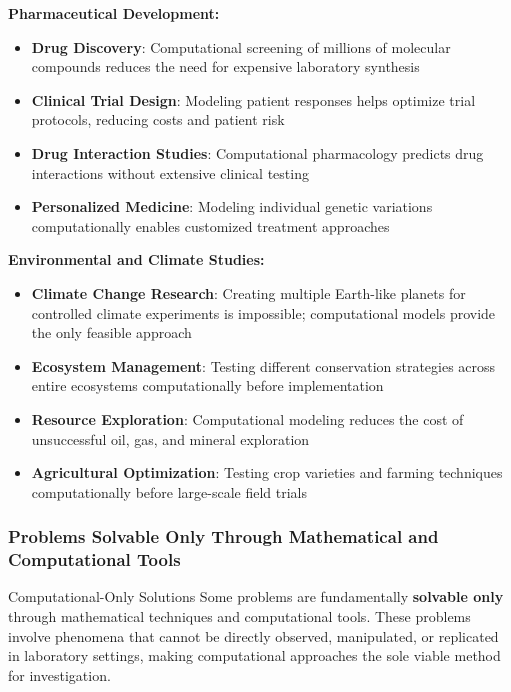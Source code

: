 \textbf{Pharmaceutical Development:}
\begin{itemize}
    \item \textbf{Drug Discovery}: Computational screening of millions of molecular compounds reduces the need for expensive laboratory synthesis
    \item \textbf{Clinical Trial Design}: Modeling patient responses helps optimize trial protocols, reducing costs and patient risk
    \item \textbf{Drug Interaction Studies}: Computational pharmacology predicts drug interactions without extensive clinical testing
    \item \textbf{Personalized Medicine}: Modeling individual genetic variations computationally enables customized treatment approaches
\end{itemize}

\textbf{Environmental and Climate Studies:}
\begin{itemize}
    \item \textbf{Climate Change Research}: Creating multiple Earth-like planets for controlled climate experiments is impossible; computational models provide the only feasible approach
    \item \textbf{Ecosystem Management}: Testing different conservation strategies across entire ecosystems computationally before implementation
    \item \textbf{Resource Exploration}: Computational modeling reduces the cost of unsuccessful oil, gas, and mineral exploration
    \item \textbf{Agricultural Optimization}: Testing crop varieties and farming techniques computationally before large-scale field trials
\end{itemize}

\subsubsection{Problems Solvable Only Through Mathematical and Computational Tools}

\begin{conceptcard}{Computational-Only Solutions}
Some problems are fundamentally \textbf{solvable only} through mathematical techniques and computational tools. These problems involve phenomena that cannot be directly observed, manipulated, or replicated in laboratory settings, making computational approaches the sole viable method for investigation.
\end{conceptcard}

